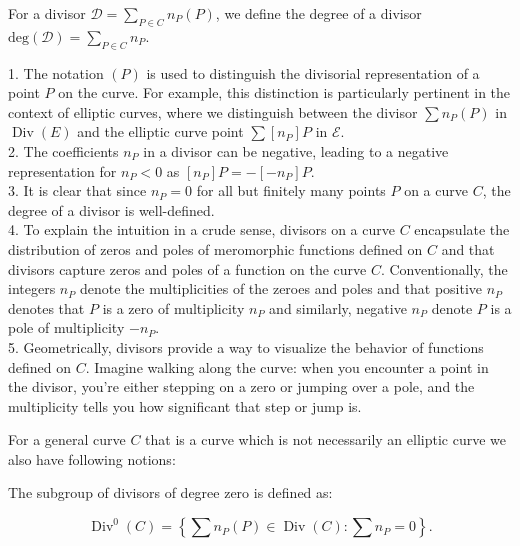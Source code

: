 \begin{definition}
    For a divisor $\mathcal{D}=\sum_{P \in C} n_{P}(P)$, we define the degree of a divisor $\text{deg}(\mathcal{D})= \sum_{P \in C} n_{P}$. 
\end{definition}
\begin{remark}

1. The notation \( (P) \) is used to distinguish the divisorial representation of a point \( P \) on the curve. For example, this distinction is particularly pertinent in the context of elliptic curves, where we distinguish between the divisor \( \sum n_{P}(P) \) in \(\operatorname{Div}(E)\) and the elliptic curve point \( \sum[n_{P}]P \) in \(\mathcal{E}\).  \\
2. The coefficients \( n_{P} \) in a divisor can be negative, leading to a negative representation for \( n_{P} < 0 \) as \( \left[n_{P}\right]P = -\left[-n_{P}\right]P \).\\
3. It is clear that since $n_P=0$ for all but finitely many points $P$ on a curve $C$, the degree of a divisor is well-defined. \\
4. To explain the intuition in a crude sense, divisors on a curve $C$ encapsulate the distribution of zeros and poles of meromorphic functions defined on $C$ and that divisors capture zeros and poles of a function on the curve $C$. Conventionally, the integers $n_P$ denote the multiplicities of the zeroes and poles and that positive $n_P$ denotes that $P$ is a zero of multiplicity $n_P$ and similarly, negative $n_P$ denote $P$ is a pole of multiplicity $-n_P$. \\
5. Geometrically, divisors provide a way to visualize the behavior of functions defined on $C$. Imagine walking along the curve: when you encounter a point in the divisor, you're either stepping on a zero or jumping over a pole, and the multiplicity tells you how significant that step or jump is.

\end{remark}
  
For a general curve \( C \) that is a curve which is not necessarily an elliptic curve we also have following notions: 
\begin{definition}
The subgroup of divisors of degree zero is defined as:

\[
\operatorname{Div}^{0}(C) = \left\{ \sum n_{P}(P) \in \operatorname{Div}(C) : \sum n_{P} = 0 \right\}.
\]
    
\end{definition}

